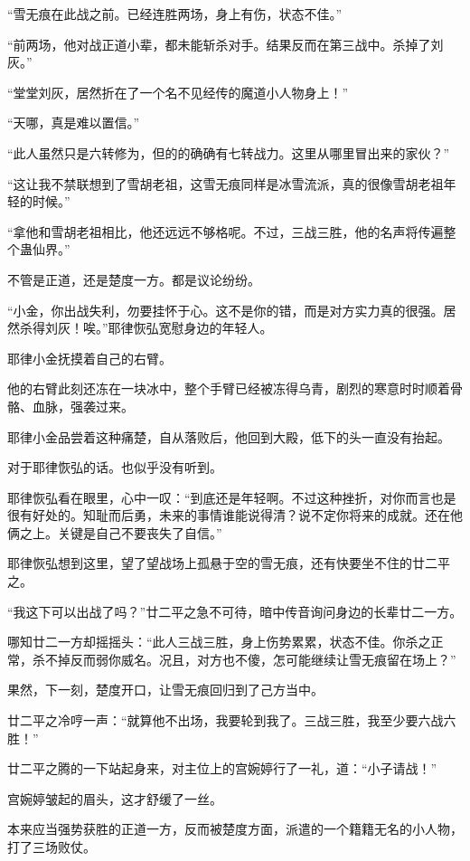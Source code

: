 \begin{this_body}
“雪无痕在此战之前。已经连胜两场，身上有伤，状态不佳。”

“前两场，他对战正道小辈，都未能斩杀对手。结果反而在第三战中。杀掉了刘灰。”

“堂堂刘灰，居然折在了一个名不见经传的魔道小人物身上！”

“天哪，真是难以置信。”

“此人虽然只是六转修为，但的的确确有七转战力。这里从哪里冒出来的家伙？”

“这让我不禁联想到了雪胡老祖，这雪无痕同样是冰雪流派，真的很像雪胡老祖年轻的时候。”

“拿他和雪胡老祖相比，他还远远不够格呢。不过，三战三胜，他的名声将传遍整个蛊仙界。”

不管是正道，还是楚度一方。都是议论纷纷。

“小金，你出战失利，勿要挂怀于心。这不是你的错，而是对方实力真的很强。居然杀得刘灰！唉。”耶律恢弘宽慰身边的年轻人。

耶律小金抚摸着自己的右臂。

他的右臂此刻还冻在一块冰中，整个手臂已经被冻得乌青，剧烈的寒意时时顺着骨骼、血脉，强袭过来。

耶律小金品尝着这种痛楚，自从落败后，他回到大殿，低下的头一直没有抬起。

对于耶律恢弘的话。也似乎没有听到。

耶律恢弘看在眼里，心中一叹：“到底还是年轻啊。不过这种挫折，对你而言也是很有好处的。知耻而后勇，未来的事情谁能说得清？说不定你将来的成就。还在他俩之上。关键是自己不要丧失了自信。”

耶律恢弘想到这里，望了望战场上孤悬于空的雪无痕，还有快要坐不住的廿二平之。

“我这下可以出战了吗？”廿二平之急不可待，暗中传音询问身边的长辈廿二一方。

哪知廿二一方却摇摇头：“此人三战三胜，身上伤势累累，状态不佳。你杀之正常，杀不掉反而弱你威名。况且，对方也不傻，怎可能继续让雪无痕留在场上？”

果然，下一刻，楚度开口，让雪无痕回归到了己方当中。

廿二平之冷哼一声：“就算他不出场，我要轮到我了。三战三胜，我至少要六战六胜！”

廿二平之腾的一下站起身来，对主位上的宫婉婷行了一礼，道：“小子请战！”

宫婉婷皱起的眉头，这才舒缓了一丝。

本来应当强势获胜的正道一方，反而被楚度方面，派遣的一个籍籍无名的小人物，打了三场败仗。


\end{this_body}
